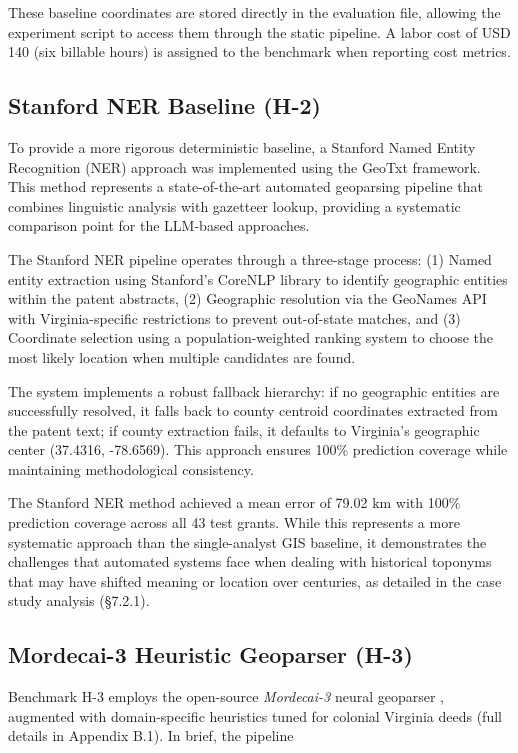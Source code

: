 These baseline coordinates are stored directly in the evaluation file,
allowing the experiment script to access them through the static
pipeline. A labor cost of USD 140 (six billable hours) is assigned to
the benchmark when reporting cost metrics.

\subsection{Stanford NER Baseline
(H-2)}\label{stanford-ner-baseline-h-2}

To provide a more rigorous deterministic baseline, a Stanford Named
Entity Recognition (NER) approach was implemented using the GeoTxt
framework. This method represents a state-of-the-art automated
geoparsing pipeline that combines linguistic analysis with gazetteer
lookup, providing a systematic comparison point for the LLM-based
approaches.

The Stanford NER pipeline operates through a three-stage process: (1)
Named entity extraction using Stanford's CoreNLP library to identify
geographic entities within the patent abstracts, (2) Geographic
resolution via the GeoNames API with Virginia-specific restrictions to
prevent out-of-state matches, and (3) Coordinate selection using a
population-weighted ranking system to choose the most likely location
when multiple candidates are found.

The system implements a robust fallback hierarchy: if no geographic
entities are successfully resolved, it falls back to county centroid
coordinates extracted from the patent text; if county extraction fails,
it defaults to Virginia's geographic center (37.4316, -78.6569). This
approach ensures 100\% prediction coverage while maintaining
methodological consistency.

The Stanford NER method achieved a mean error of 79.02 km with 100\%
prediction coverage across all 43 test grants. While this represents a
more systematic approach than the single-analyst GIS baseline, it
demonstrates the challenges that automated systems face when dealing
with historical toponyms that may have shifted meaning or location over
centuries, as detailed in the case study analysis (§7.2.1).

\subsection{Mordecai-3 Heuristic Geoparser
(H-3)}\label{mordecai-3-heuristic-geoparser-h-3}

Benchmark H-3 employs the open-source \emph{Mordecai-3} neural geoparser
\citep{halterman2023mordecai}, augmented with domain-specific heuristics
tuned for colonial Virginia deeds (full details in Appendix B.1). In
brief, the pipeline


